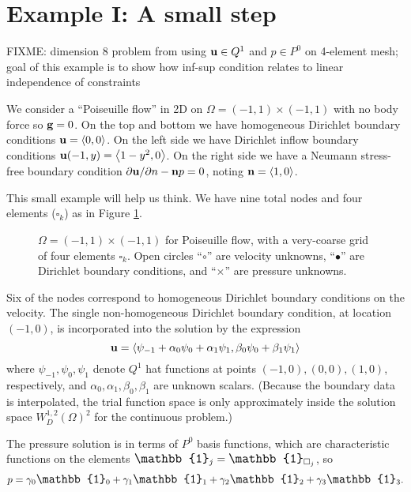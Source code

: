 \section{Example I: A small step}

FIXME: dimension 8 problem from using $\mathbf{u}\in Q^1$ and $p\in P^0$ on 4-element mesh; goal of this example is to show how inf-sup condition relates to linear independence of constraints

We consider a ``Poiseuille flow'' \citep{Elmanetal2005} in 2D on $\Omega=(-1,1)\times(-1,1)$ with no body force so $\mathbf{g}=0$.  On the top and bottom we have homogeneous Dirichlet boundary conditions $\mathbf{u}=\left<0,0\right>$.  On the left side we have Dirichlet inflow boundary conditions $\mathbf{u}(-1,y) = \left<1-y^2,0\right>$.  On the right side we have a Neumann stress-free boundary condition $\partial \mathbf{u}/\partial n - \mathbf{n} p = 0$, noting $\mathbf{n} = \left<1,0\right>$.

\newcommand{\one}{{\large \mathbb{1}}}

This small example will help us think.  We have nine total nodes and four elements ($\square_k$) as in Figure \ref{fig:ok:poiseuille}.

\begin{figure}

\caption{$\Omega=(-1,1)\times(-1,1)$ for Poiseuille flow, with a very-coarse grid of four elements $\square_k$.  Open circles ``{\large $\circ$}'' are velocity unknowns, ``$\bullet$'' are Dirichlet boundary conditions, and ``$\times$'' are pressure unknowns.}
\label{fig:ok:poiseuille}
\end{figure}

Six of the nodes correspond to homogeneous Dirichlet boundary conditions on the velocity.  The single non-homogeneous Dirichlet boundary condition, at location $(-1,0)$, is incorporated into the solution by the expression
\begin{equation} 
\mathbf{u} = \left<\psi_{-1}+\alpha_0\psi_0+\alpha_1\psi_1,\beta_0\psi_0+\beta_1\psi_1\right>  \label{eq:ok:smallexpansionvelocity}
\end{equation}
where $\psi_{-1},\psi_0,\psi_1$ denote $Q^1$ hat functions at points $(-1,0),(0,0),(1,0)$, respectively, and $\alpha_0,\alpha_1,\beta_0,\beta_1$ are unknown scalars.  (Because the boundary data is interpolated, the trial function space is only approximately inside the solution space $W_D^{1,2}(\Omega)^2$ for the continuous problem.)

The pressure solution is in terms of $P^0$ basis functions, which are characteristic functions on the elements $\one_j = \one_{\square_j}$, so
\begin{equation}
p = \gamma_0 \one_0 + \gamma_1 \one_1 + \gamma_2 \one_2 + \gamma_3 \one_3.  \label{eq:ok:smallexpansionpressure}
\end{equation}

